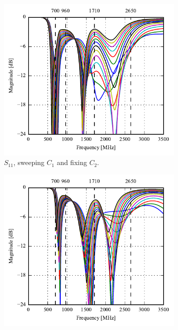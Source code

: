 \begin{figure}[htbp]
   \begin{subfigure}[b]{0.49\linewidth}
        \centering
        \includegraphics{img/tech_sol/trianglefeed/play_mode/Csh1s11.pdf}
        \caption{$S_{11}$, sweeping $C_1$ and fixing $C_2$.}
    \end{subfigure}
    \hfill
    \begin{subfigure}[b]{0.49\linewidth}
        \centering
        \includegraphics{img/tech_sol/trianglefeed/play_mode/Csh2s22.pdf}

\end{subfigure}
\end{figure}
